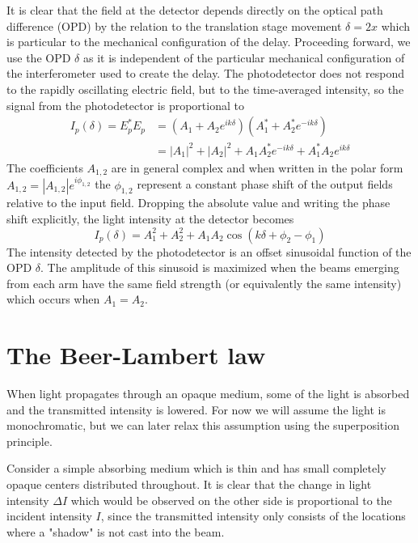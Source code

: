 It is clear that the field at the detector depends directly on the optical path difference (OPD) by the relation to the translation stage movement $\delta = 2x$ which is particular to the mechanical configuration of the delay. Proceeding forward, we use the OPD $\delta$ as it is independent of the particular mechanical configuration of the interferometer used to create the delay. The photodetector does not respond to the rapidly oscillating electric field, but to the time-averaged intensity, so the signal from the photodetector is proportional to
\begin{align}
	I_p(\delta) = E_p^*E_p &= \left(A_1 + A_2 e^{ik\delta}\right)\left(A_1^* + A_2^* e^{-ik\delta}\right) \\
	&= \left|A_1\right|^2 + \left|A_2\right|^2 + A_1A_2^*e^{-ik\delta} + A_1^*A_2e^{ik\delta}
\end{align}
The coefficients $A_{1,2}$ are in general complex and when written in the polar form $A_{1,2} = \left|A_{1,2}\right| e^{i\phi_{1,2}}$ the $\phi_{1,2}$ represent a constant phase shift of the output fields relative to the input field. Dropping the absolute value and writing the phase shift explicitly, the light intensity at the detector becomes
\begin{equation}\label{wl_sig_monochromatic}
	I_p(\delta) = A_1^2 + A_2^2 + A_1A_2\cos(k\delta + \phi_2 - \phi_1)
\end{equation}
The intensity detected by the photodetector is an offset sinusoidal function of the OPD $\delta$. The amplitude of this sinusoid is maximized when the beams emerging from each arm have the same field strength (or equivalently the same intensity) which occurs when $A_1 = A_2$.

\section{The Beer-Lambert law}
When light propagates through an opaque medium, some of the light is absorbed and the transmitted intensity is lowered. For now we will assume the light is monochromatic, but we can later relax this assumption using the superposition principle.

Consider a simple absorbing medium which is thin and has small completely opaque centers distributed throughout. It is clear that the change in light intensity $\Delta I$ which would be observed on the other side is proportional to the incident intensity $I$, since the transmitted intensity only consists of the locations where a "shadow" is not cast into the beam.

